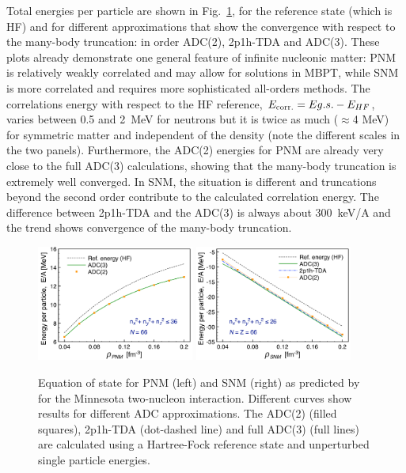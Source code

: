 Total energies per particle are shown in Fig.~\ref{fig:minn_adc_eos}, for the reference state (which is HF) and for different approximations that show the convergence with respect to the many-body truncation: in order ADC(2), 2p1h-TDA and ADC(3).
%
These plots already demonstrate one general feature of infinite nucleonic matter: PNM is relatively weakly correlated and may allow for solutions in MBPT, while SNM is more correlated and  requires more sophisticated  all-orders methods. The correlations energy with respect to the HF reference, $E_{\rm corr.}=Eg.s. - E_{HF}$, varies between 0.5 and 2~MeV for neutrons but it is twice as much ($\approx$4 MeV) for symmetric matter and independent of the density (note the different scales in the two panels). 
%
Furthermore, the ADC(2) energies for PNM are already very close to the full ADC(3) calculations, showing that the many-body truncation is extremely well converged. In SNM, the situation is different and  truncations beyond the second  order contribute to  the calculated  correlation energy.  The difference between 2p1h-TDA and the ADC(3) is always about 300~keV/A and the trend shows convergence of the many-body truncation.
\begin{figure}[t]
\begin{center}
\includegraphics[width=0.46\textwidth]{Chapter11-figures/PNM_conv_ADC.pdf}  \hspace{0.06\textwidth}
\includegraphics[width=0.46\textwidth]{Chapter11-figures/SNM_conv_ADC.pdf}
\caption{Equation of state for PNM (left) and SNM (right) as predicted by for the Minnesota two-nucleon interaction. Different curves show results for different ADC approximations. The ADC(2) (filled squares), 2p1h-TDA (dot-dashed line) and full ADC(3) (full lines) are calculated using a Hartree-Fock reference state and unperturbed single particle energies.}
\label{fig:minn_adc_eos}
\end{center}
\end{figure}


